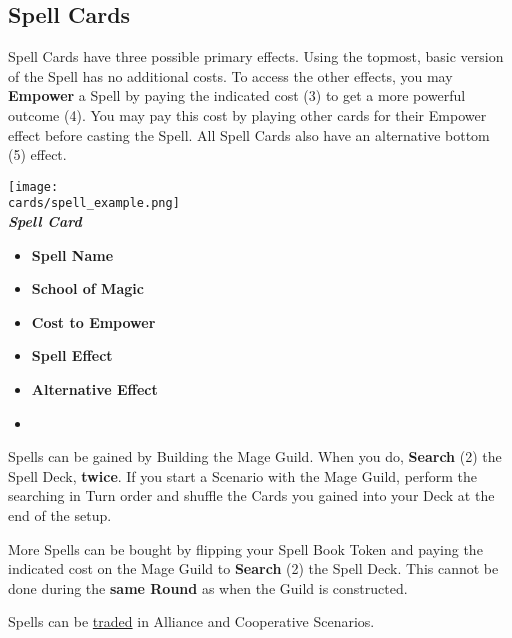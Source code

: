 \begin{multicols*}{2}
\subsection*{\hypertarget{spells}{Spell Cards}}

Spell Cards have three possible primary effects.
Using the topmost, basic version of the Spell has no additional costs.
To access the other effects, you may \textbf{Empower} a Spell by paying the indicated cost (3) to get a more powerful outcome (4).
You may pay this cost by playing other cards for their Empower  effect before casting the Spell.
All Spell Cards also have an alternative bottom (5)  effect.\par

\filbreak
\begin{center}
  \texttt{[image: \\cards/spell\_example.png]}\\
  \medskip
  \footnotesize{\textbf{\textit{\textcolor{darkcandyapplered}{Spell Card}}}}
  \scriptsize
  \begin{multicols}{2}
    \begin{itemize}[itemsep=5pt]
      \item[\textbf{1.}] \textbf{Spell Name}
      \item[\textbf{2.}] \textbf{School of Magic}
      \item[\textbf{3.}] \textbf{Cost to Empower}
      \item[\textbf{4.}] \textbf{Spell Effect}
      \item[\textbf{5.}] \textbf{Alternative Effect}
      \item[]
    \end{itemize}
  \end{multicols}
\end{center}

\par
Spells can be gained by Building the Mage Guild.
When you do, \textbf{Search} (2) the Spell Deck, \textbf{twice}.
If you start a Scenario with the Mage Guild, perform the searching in Turn order and shuffle the Cards you gained into your Deck at the end of the setup.\par
More Spells can be bought by flipping your Spell Book Token and paying the indicated cost on the Mage Guild to \textbf{Search} (2) the Spell Deck.
This cannot be done during the \textbf{same Round} as when the Guild is constructed.\par
Spells can be \hyperlink{Trading}{traded} in Alliance and Cooperative Scenarios.


\end{multicols*}
